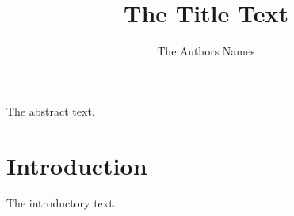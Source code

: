 \documentclass{article}
\title{The Title Text}
\author{The Authors Names}
\begin{document}
\maketitle
\abstract
The abstract text.
\section{Introduction}
The introductory text.
\end{document}
